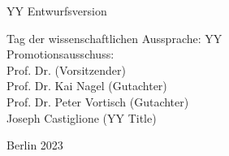 \begin{flushright}
	YY Entwurfsversion \\

	\hrulefill

 	Tag der wissenschaftlichen Aussprache: YY  \\

	\vspace{5mm}
	Promotionsausschuss:\\
	Prof. Dr. (Vorsitzender)\\
    	Prof. Dr. Kai Nagel (Gutachter)\\
    	Prof. Dr. Peter Vortisch (Gutachter)\\
     	Joseph Castiglione (YY Title)\\
	\vspace{6mm}

	Berlin 2023\\

\end{flushright}